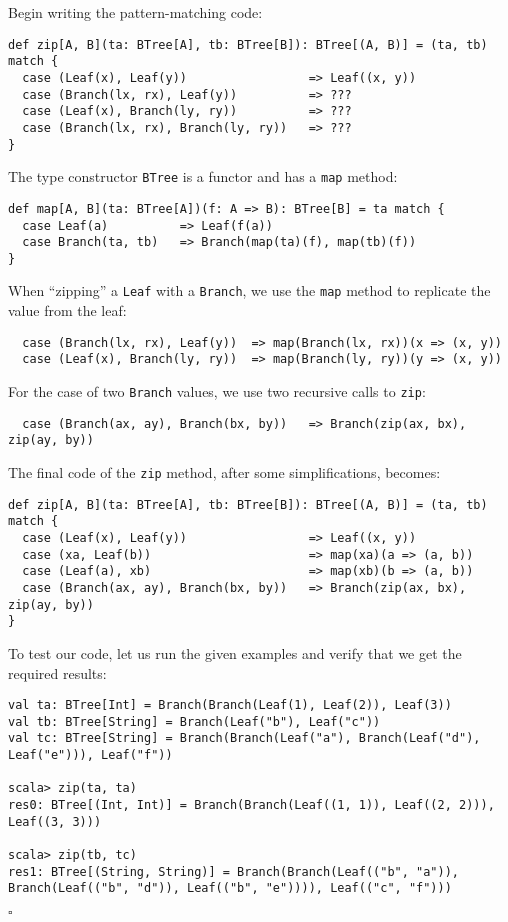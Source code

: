 Begin writing the pattern-matching code: 
\begin{lstlisting}
def zip[A, B](ta: BTree[A], tb: BTree[B]): BTree[(A, B)] = (ta, tb) match {
  case (Leaf(x), Leaf(y))                 => Leaf((x, y))
  case (Branch(lx, rx), Leaf(y))          => ???
  case (Leaf(x), Branch(ly, ry))          => ???
  case (Branch(lx, rx), Branch(ly, ry))   => ???
}
\end{lstlisting}
The type constructor \lstinline!BTree! is a functor and has a \lstinline!map!
method:
\begin{lstlisting}
def map[A, B](ta: BTree[A])(f: A => B): BTree[B] = ta match {
  case Leaf(a)          => Leaf(f(a))
  case Branch(ta, tb)   => Branch(map(ta)(f), map(tb)(f))
}
\end{lstlisting}
When \textsf{``}zipping\textsf{''} a \lstinline!Leaf! with a \lstinline!Branch!,
we use the \lstinline!map! method to replicate the value from the
leaf:
\begin{lstlisting}
  case (Branch(lx, rx), Leaf(y))  => map(Branch(lx, rx))(x => (x, y))
  case (Leaf(x), Branch(ly, ry))  => map(Branch(ly, ry))(y => (x, y)) 
\end{lstlisting}
For the case of two \lstinline!Branch! values, we use two recursive
calls to \lstinline!zip!:
\begin{lstlisting}
  case (Branch(ax, ay), Branch(bx, by))   => Branch(zip(ax, bx), zip(ay, by))
\end{lstlisting}
The final code of the \lstinline!zip! method, after some simplifications,
becomes:

\begin{lstlisting}
def zip[A, B](ta: BTree[A], tb: BTree[B]): BTree[(A, B)] = (ta, tb) match {
  case (Leaf(x), Leaf(y))                 => Leaf((x, y))
  case (xa, Leaf(b))                      => map(xa)(a => (a, b))
  case (Leaf(a), xb)                      => map(xb)(b => (a, b))
  case (Branch(ax, ay), Branch(bx, by))   => Branch(zip(ax, bx), zip(ay, by))
}
\end{lstlisting}
To test our code, let us run the given examples and verify that we
get the required results:
\begin{lstlisting}
val ta: BTree[Int] = Branch(Branch(Leaf(1), Leaf(2)), Leaf(3))
val tb: BTree[String] = Branch(Leaf("b"), Leaf("c"))
val tc: BTree[String] = Branch(Branch(Leaf("a"), Branch(Leaf("d"), Leaf("e"))), Leaf("f")) 

scala> zip(ta, ta)
res0: BTree[(Int, Int)] = Branch(Branch(Leaf((1, 1)), Leaf((2, 2))), Leaf((3, 3)))

scala> zip(tb, tc)
res1: BTree[(String, String)] = Branch(Branch(Leaf(("b", "a")), Branch(Leaf(("b", "d")), Leaf(("b", "e")))), Leaf(("c", "f"))) 
\end{lstlisting}
$\square$

